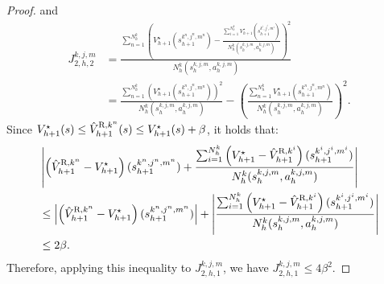 \documentclass{article}
\newcommand{\R}{\textnormal{R}}
\begin{document}
\begin{proof}
and
\begin{align*}
    J_{2,h,2}^{k,j,m}&= \frac{\sum_{n=1}^{N_h^k}\left(V_{h+1}^{\star}(s_{h+1}^{k^n,j^n,m^n})-\frac{\sum_{i=1}^{N_h^k}V_{h+1}^{\star}(s_{h+1}^{k^i,j^i,m^i})}{N_h^k(s_h^{k,j,m}, a_h^{k,j,m})}\right)^2}{N_h^k(s_h^{k,j,m}, a_h^{k,j,m})} \\
    &= \frac{\sum_{n=1}^{N_h^k}\left(V_{h+1}^{\star}(s_{h+1}^{k^n,j^n,m^n})\right)^2}{N_h^k(s_h^{k,j,m}, a_h^{k,j,m})}-\left(\frac{\sum_{n=1}^{N_h^k}V_{h+1}^{\star}(s_{h+1}^{k^n,j^n,m^n})}{N_h^k(s_h^{k,j,m}, a_h^{k,j,m})}\right)^2.
\end{align*}
Since $V_{h+1}^{\star}(s) \leq \hat{V}_{h+1}^{\R,k^n}(s) \leq V_{h+1}^{\star}(s)+\beta$, it holds that:
\begin{align*}
    &\left|\left(\hat{V}_{h+1}^{\R,k^n}-V_{h+1}^{\star}\right)(s_{h+1}^{k^n,j^n,m^n})+\frac{\sum_{i=1}^{N_h^k}\left(V_{h+1}^{\star}-\hat{V}_{h+1}^{\R,k^i}\right)(s_{h+1}^{k^i,j^i,m^i})}{N_h^k(s_h^{k,j,m}, a_h^{k,j,m})}\right| \\
& \leq \left|\left(\hat{V}_{h+1}^{\R,k^n}-V_{h+1}^{\star}\right)(s_{h+1}^{k^n,j^n,m^n})\right|+\left|\frac{\sum_{i=1}^{N_h^k}\left(V_{h+1}^{\star}-\hat{V}_{h+1}^{\R,k^i}\right)(s_{h+1}^{k^i,j^i,m^i})}{N_h^k(s_h^{k,j,m}, a_h^{k,j,m})}\right|\\
&\leq 2\beta.
\end{align*}
Therefore, applying this inequality to $J_{2,h,1}^{k,j,m}$, we have $J_{2,h,1}^{k,j,m} \leq 4\beta^2$. 


\end{proof}
\end{document}
